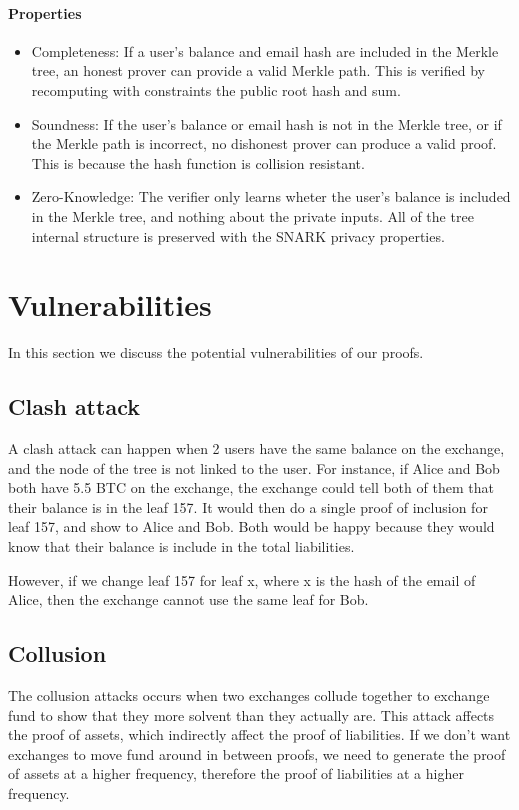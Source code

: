 \paragraph{Properties}
\begin{itemize}
   \item Completeness: If a user's balance and email hash are included in the Merkle tree, an honest prover can provide a valid Merkle path. This is verified by recomputing with constraints the public root hash and sum.
   \item Soundness: If the user's balance or email hash is not in the Merkle tree, or if the Merkle path is incorrect, no dishonest prover can produce a valid proof. This is because the hash function is collision resistant.
   \item Zero-Knowledge: The verifier only learns wheter the user's balance is included in the Merkle tree, and nothing about the private inputs. All of the tree internal structure is preserved with the SNARK privacy properties.
   \end{itemize}

\section{Vulnerabilities}
In this section we discuss the potential vulnerabilities of our proofs.

\subsection{Clash attack}
\label{subsec:ca}
A clash attack can happen when 2 users have the same balance on the exchange, and the node of the tree is not linked to the user. 
For instance, if Alice and Bob both have 5.5 BTC on the exchange, the exchange could tell both of them that their balance is in the leaf 157. 
It would then do a single proof of inclusion for leaf 157, and show to Alice and Bob. Both would be happy because they would know that their balance is include in the total liabilities.

However, if we change leaf 157 for leaf x, where x is the hash of the email of Alice, then the exchange cannot use the same leaf for Bob.

\subsection{Collusion}
The collusion attacks occurs when two exchanges collude together to exchange fund to show that they more solvent than they actually are.
This attack affects the proof of assets, which indirectly affect the proof of liabilities. If we don't want exchanges to move fund around in between proofs,
we need to generate the proof of assets at a higher frequency, therefore the proof of liabilities at a higher frequency.

